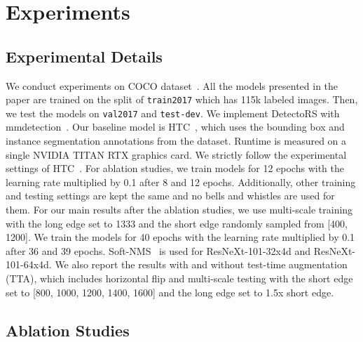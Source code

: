 \documentclass[final]{cvpr}
\begin{document}
\section{Experiments}\label{sec:exp}

\subsection{Experimental Details}
We conduct experiments on COCO dataset~\cite{coco}.
All the models presented in the paper are trained on the split of \texttt{train2017} which has 115k labeled images.
Then, we test the models on \texttt{val2017} and \texttt{test-dev}.
We implement DetectoRS with mmdetection~\cite{mmdetection}.
Our baseline model is HTC~\cite{htc}, which uses the bounding box and instance segmentation annotations from the dataset.
Runtime is measured on a single NVIDIA TITAN RTX graphics card.
We strictly follow the experimental settings of HTC~\cite{htc}.
For ablation studies, we train models for 12 epochs with the learning rate multiplied by 0.1 after 8 and 12 epochs.
Additionally, other training and testing settings are kept the same and no bells and whistles are used for them.
For our main results after the ablation studies, we use multi-scale training with the long edge set to 1333 and the short edge randomly sampled from [400, 1200].
We train the models for 40 epochs with the learning rate multiplied by 0.1 after 36 and 39 epochs.
Soft-NMS~\cite{softnms} is used for ResNeXt-101-32x4d and ResNeXt-101-64x4d.
We also report the results with and without test-time augmentation (TTA), which includes horizontal flip and multi-scale testing with the short edge set to [800, 1000, 1200, 1400, 1600] and the long edge set to 1.5x short edge.

\subsection{Ablation Studies}
\end{document}
